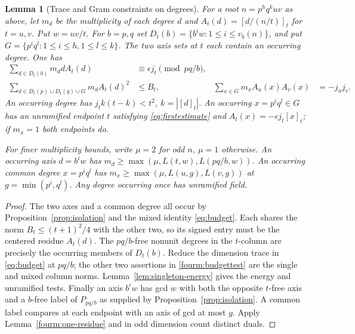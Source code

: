 \documentclass[11pt,a4paper]{article}
\numberwithin{equation}{section}
\newtheorem{lemma}[theorem]{Lemma}
\theoremstyle{remark}
\begin{document}
\begin{lemma}[Trace and Gram constraints on degrees]\label{fam:M:8.13}\label{fourm:dyadicbudget}\label{seq:end-criterion}
For a root $n=p^hq^kuv$ as above, let $m_d$ be the multiplicity of
each degree $d$ and $A_t(d)=[d/(n/t)]_t$ for $t=u,v$. Put $w=uv/t$.
For $b=p,q$ set $D_t(b)=\{b^i w:1\le i\le v_b(n)\}$, and put
$G=\{p^iq^l:1\le i\le h,1\le l\le k\}$. The two axis sets at $t$
each contain an occurring degree. One has
\begin{align}
 \sum_{d\in D_t(b)}m_d dA_t(d)&\equiv\epsilon j_t\pmod{pq/b},\nonumber\\
 \sum_{d\in D_t(p)\cup D_t(q)\cup G} m_d A_t(d)^2&\le B_t, &
 \sum_{x\in G}m_x A_u(x)A_v(x)&=-j_uj_v.\label{fourm:budgettest}
\end{align}
An occurring degree has $j_tk(t-k)<t^2$, $k=|[d]_t|$.
An occurring $x=p^i q^l\in G$ has an unramified endpoint
$t$ satisfying \eqref{eq:firstestimate} and
$A_t(x)=-\epsilon j_t[x]_t$; if $m_x=1$ both endpoints do.

For finer multiplicity bounds, write $\mu=2$ for odd $n$, $\mu=1$
otherwise. An occurring axis $d=b^i w$ has
$m_d\ge\max(\mu,L(t,w),L(pq/b,w))$. An occurring common degree
$x=p^iq^l$ has $m_x\ge\max(\mu,L(u,g),L(v,g))$ at
$g=\min(p^i,q^l)$. Any degree occurring once has unramified field.
\end{lemma}
\begin{proof}
The two axes and a common degree all occur by
Proposition~\ref{prop:isolation} and the mixed identity
\eqref{eq:budget}. Each shares the norm $B_t\le(t+1)^2/4$ with
the other two, so its signed entry must be the centered residue
$A_t(d)$. The $pq/b$-free nonunit degrees in the $t$-column are
precisely the occurring members of $D_t(b)$. Reduce the dimension
trace in \eqref{eq:budget} at $pq/b$; the other two assertions in
\eqref{fourm:budgettest} are the single and mixed column norms.
Lemma~\ref{lem:singleton-energy} gives the energy and unramified
tests. Finally an axis $b^iw$ has gcd $w$ with both the opposite
$t$-free axis and a $b$-free label of $P_{pq/b}$ as supplied by
Proposition~\ref{prop:isolation}. A common label compares at each
endpoint with an axis of gcd at most $g$. Apply
Lemma~\ref{fourm:one-residue} and in odd dimension count distinct duals.
\end{proof}
\end{document}

